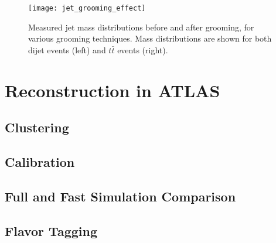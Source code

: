 \begin{figure}[h!]
    \centering
\texttt{[image: jet\_grooming\_effect]}
\caption{Measured jet mass distributions before and after grooming, for various grooming techniques.
Mass distributions are shown for both dijet events (left) and $t\bar{t}$ events (right).}
\label{fig:jet_grooming_effect}
\end{figure}

\section{Reconstruction in ATLAS}\label{sec:jet_reconstruction}
\subsection{Clustering}\label{subsec:jet_clustering}
\subsection{Calibration}\label{subsec:jet_calibration}
\subsection{Full and Fast Simulation Comparison}\label{subsec:jet_full_vs_fast_sim}
\subsection{Flavor Tagging}\label{subsec:jet_flavor_tagging}